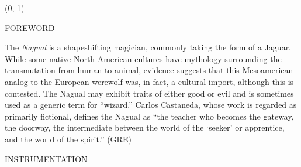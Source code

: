 \documentclass[11pt]{article}
\begin{document}
\begin{textblock}{23}(0, 1)
\begin{center}
\huge FOREWORD
\end{center}
\end{textblock}

\vspace*{0.25\baselineskip}

\begingroup
\begin{center}
The \textit{Nagual} is a shapeshifting magician, commonly taking the form of a Jaguar. While some native North American cultures have mythology surrounding the transmutation from human to animal, evidence suggests that this Mesoamerican analog to the European werewolf was, in fact, a cultural import, although this is contested. The Nagual may exhibit traits of either good or evil and is sometimes used as a generic term for ``wizard.'' Carlos Castaneda, whose work is regarded as primarily fictional, defines the Nagual as ``the teacher who becomes the gateway, the doorway, the intermediate between the world of the `seeker' or apprentice, and the world of the spirit.''
\rightskip\leftskip
\phantom{text} \hfill (GRE)
\end{center}
\endgroup



\begin{center}
\huge INSTRUMENTATION
\end{center}
\end{document}
